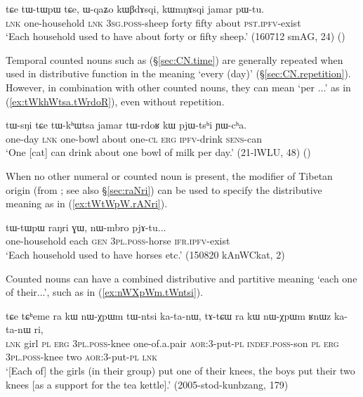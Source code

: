 \begin{exe}
	\ex \label{ex:tWtWpW.tCe}
	\gll tɕe tɯ-tɯpɯ tɕe, ɯ-qaʑo kɯβdɤsqi, kɯmŋɤsqi jamar pɯ-tu. \\
	\textsc{lnk} one-household \textsc{lnk} \textsc{3sg}.\textsc{poss}-sheep forty fifty about \textsc{pst}.\textsc{ipfv}-exist \\
	\glt `Each household used to have about forty or fifty sheep.' (160712 smAG, 24)
()
\end{exe} 


Temporal counted nouns such as  (§\ref{sec:CN.time}) are generally repeated when used in distributive function in the meaning `every (day)' (§\ref{sec:CN.repetition}). However, in combination with other counted nouns, they can mean `per ...' as in (\ref{ex:tWkhWtsa.tWrdoR}), even without repetition.

\begin{exe}
	\ex \label{ex:tWkhWtsa.tWrdoR}
	\gll tɯ-sŋi tɕe tɯ-kʰɯtsa jamar tɯ-rdoʁ kɯ pjɯ-tsʰi ɲɯ-cʰa. \\
	one-day \textsc{lnk} one-bowl about one-\textsc{cl} \textsc{erg} \textsc{ipfv}-drink \textsc{sens}-can \\
	\glt `One [cat] can drink about one bowl of milk per day.' (21-lWLU, 48)
()
\end{exe}

When no other numeral or counted noun is present, the modifier of Tibetan origin  (from ; see also §\ref{sec:raNri}) can be used to specify the distributive meaning as in (\ref{ex:tWtWpW.rANri}).

\begin{exe}
	\ex \label{ex:tWtWpW.rANri}
	\gll tɯ-tɯpɯ raŋri ɣɯ, nɯ-mbro pjɤ-tu... \\
	one-household  each \textsc{gen} \textsc{3pl}.\textsc{poss}-horse \textsc{ifr}.\textsc{ipfv}-exist \\
	\glt `Each household used to have horses etc.' (150820 kAnWCkat, 2)
\end{exe} 

Counted nouns can have a combined distributive and partitive meaning `each one of their...', such as  in (\ref{ex:nWXpWm.tWntsi}).

\begin{exe}
	\ex \label{ex:nWXpWm.tWntsi}
	\gll tɕe tɕʰeme ra kɯ nɯ-χpɯm tɯ-ntsi ka-ta-nɯ, tɤ-tɕɯ ra kɯ nɯ-χpɯm ʁnɯz ka-ta-nɯ ri,  \\
	\textsc{lnk} girl \textsc{pl} \textsc{erg} \textsc{3pl}.\textsc{poss}-knee one-of.a.pair \textsc{aor}:3\flobv{}-put-\textsc{pl} \textsc{indef}.\textsc{poss}-son \textsc{pl} \textsc{erg}  \textsc{3pl}.\textsc{poss}-knee two \textsc{aor}:3\flobv{}-put-\textsc{pl} \textsc{lnk} \\
	\glt `[Each of] the girls (in their group) put one of their knees, the boys put their two knees [as a support for the tea kettle].' (2005-stod-kunbzang, 179)
\end{exe}


